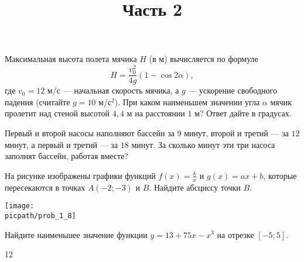 \begin{training}[2]
\begin{listofex}
		Максимальная высота полета мячика \( H \) (в м) вычисляется по формуле
		\[ H=\dfrac{v_0^2}{4g}(1-\cos2\alpha), \]
		где \( v_0 = 12 \) м/с --- начальная скорость мячика, а \( g \) --- ускорение свободного падения (считайте \( g = 10 \) м/с\( ^2 \)).
		При каком наименьшем значении угла \( \alpha \) мячик пролетит над стеной высотой \( 4,4 \) м на расстоянии \( 1 \) м?
		Ответ дайте в градусах.
		\foranswer
		\newpage
		\hphantom{Часть 1}
		\item Первый и второй насосы наполняют бассейн за \( 9 \) минут,
		второй и третий --- за \( 12 \) минут, а первый и третий --- за \( 18 \) минут.
		За сколько минут эти три насоса заполнят бассейн, работая вместе?
		\foranswer
		\item 
		На рисунке изображены графики функций \( f(x) = \frac{k}{x} \) и \( g(x) = ax+b \),
		которые пересекаются в точках \( A(-2;-3) \) и \( B \). Найдите абсциссу точки \( B \).
		\begin{center}
			\texttt{[image: \\picpath/prob\_1\_8]}
		\end{center}
		\foranswer
		\item Найдите наименьшее значение функции \( y=13+75x-x^3 \) на отрезке \( [-5;5] \).
		\foranswer
		\egepreambtwo
		\title{Часть 2}
		\item 12
	\end{listofex}
\end{training}

